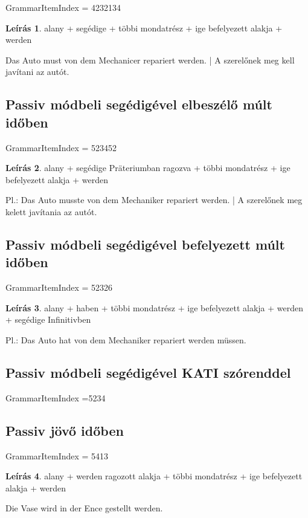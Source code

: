 \documentclass{article}
\theoremstyle{definition}
\newtheorem*{desc}{Leírás}
\begin{document}
GrammarItemIndex = 4232134

\begin{desc}
alany + segédige + többi mondatrész + ige befelyezett alakja + werden

Das Auto must von dem Mechanicer repariert werden. | A szerelőnek meg kell javítani az autót.
\end{desc}

\subsection{Passiv módbeli segédigével elbeszélő múlt időben}

GrammarItemIndex = 523452

\begin{desc}
alany + segédige Präteriumban ragozva + többi mondatrész + ige befelyezett alakja + werden

Pl.: Das Auto musste von dem Mechaniker repariert werden. | A szerelőnek meg kelett javítania az autót.
\end{desc}

\subsection{Passiv módbeli segédigével befelyezett múlt időben}

GrammarItemIndex = 52326

\begin{desc}
alany + haben + többi mondatrész + ige befelyezett alakja + werden + segédige Infinitivben

Pl.: Das Auto hat von dem Mechaniker repariert werden müssen.
\end{desc}

\subsection{Passiv módbeli segédigével KATI szórenddel}

GrammarItemIndex =5234

\subsection{Passiv jövő időben}

GrammarItemIndex = 5413

\begin{desc}
alany + werden ragozott alakja + többi mondatrész + ige befelyezett alakja + werden

Die Vase wird in der Ence gestellt werden.
\end{desc}
\end{document}
